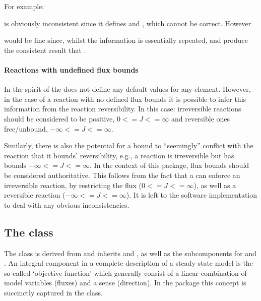 For example:


is obviously inconsistent since it defines  and , which cannot be correct. However


would be fine since, whilst the information is essentially repeated,  and  produce the consistent result that .

\paragraph{Reactions with undefined flux bounds}
In the spirit of \sbmlthreecore the \FBCPackage does not define any default values for any element. However, in the case of a reaction with no defined flux bounds it is possible to infer this information from the reaction reversibility. In this case: irreversible reactions should be considered to be positive, $0 <= J <= \infty$ and reversible ones free/unbound, $-\infty <= J <= \infty$.

Similarly, there is also the potential for a bound to ``seemingly'' conflict with the reaction that it bounds' reversibility, e.g., a reaction is irreversible but has bounds $-\infty <= J <= \infty$. In the context of this package, flux bounds should be considered authoritative. This follows from the fact that a \FluxBound can enforce an irreversible reaction, by restricting the flux ($0 <= J <= \infty$), as well as a reversible reaction ($-\infty <= J <= \infty$). It is left to the software implementation to deal with any obvious inconsistencies.


\subsection{The \FBC {} class}
\label{objective-class}
\label{listoffluxobjectives-class}

The \FBC \Objective class is derived from \SBML \SBase and inherits
 and , as well as the subcomponents for
\Annotation and \Notes. An integral component in a complete description
of a steady-state model is the so-called `objective function' which generally
consist of a linear combination of model variables (fluxes) and a sense
(direction). In the \FBC package this concept is succinctly captured in the
\Objective class.


